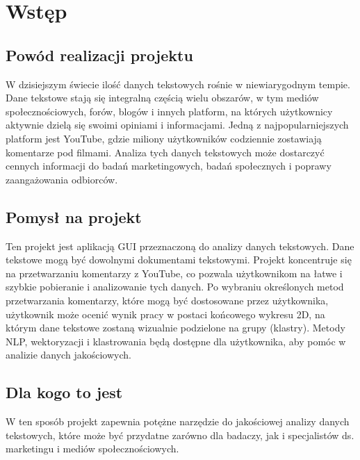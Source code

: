 \chapter*{Wstęp}
\section{Powód realizacji projektu}
		W dzisiejszym świecie ilość danych tekstowych rośnie w niewiarygodnym tempie. Dane tekstowe stają się integralną częścią wielu obszarów, w tym mediów społecznościowych, forów, blogów i innych platform, na których użytkownicy aktywnie dzielą się swoimi opiniami i informacjami. Jedną z najpopularniejszych platform jest YouTube, gdzie miliony użytkowników codziennie zostawiają komentarze pod filmami. Analiza tych danych tekstowych może dostarczyć cennych informacji do badań marketingowych, badań społecznych i poprawy zaangażowania odbiorców.

\section{Pomysł na projekt}
 		Ten projekt jest aplikacją GUI przeznaczoną do analizy danych tekstowych. Dane tekstowe mogą być dowolnymi dokumentami tekstowymi. Projekt koncentruje się na przetwarzaniu komentarzy z YouTube, co pozwala użytkownikom na łatwe i szybkie pobieranie i analizowanie tych danych. Po wybraniu określonych metod przetwarzania komentarzy, które mogą być dostosowane przez użytkownika, użytkownik może ocenić wynik pracy w postaci końcowego wykresu 2D, na którym dane tekstowe zostaną wizualnie podzielone na grupy (klastry). Metody NLP, wektoryzacji i klastrowania będą dostępne dla użytkownika, aby pomóc w analizie danych jakościowych. 
 	

 \section{Dla kogo to jest}
 		W ten sposób projekt zapewnia potężne narzędzie do jakościowej analizy danych tekstowych, które może być przydatne zarówno dla badaczy, jak i specjalistów ds. marketingu i mediów społecznościowych.

